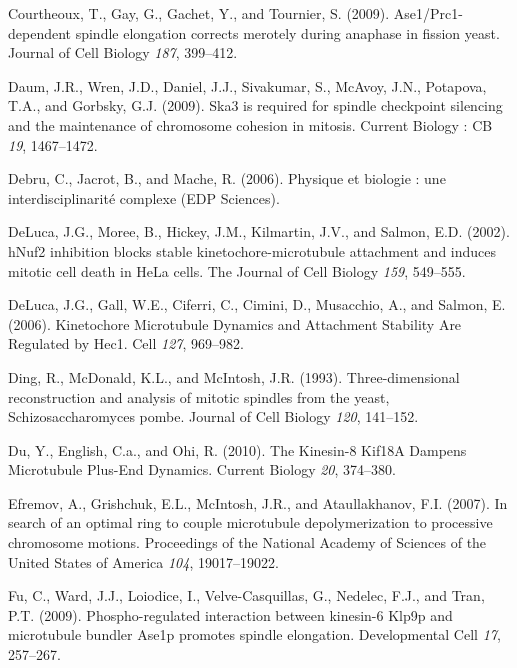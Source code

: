 \documentclass[12pt,a4paper,twoside,openright]{book}
\begin{document}
Courtheoux, T., Gay, G., Gachet, Y., and Tournier, S. (2009).
Ase1/Prc1-dependent spindle elongation corrects merotely during anaphase
in fission yeast. Journal of Cell Biology \emph{187}, 399--412.

Daum, J.R., Wren, J.D., Daniel, J.J., Sivakumar, S., McAvoy, J.N.,
Potapova, T.A., and Gorbsky, G.J. (2009). Ska3 is required for spindle
checkpoint silencing and the maintenance of chromosome cohesion in
mitosis. Current Biology : CB \emph{19}, 1467--1472.

Debru, C., Jacrot, B., and Mache, R. (2006). Physique et biologie : une
interdisciplinarité complexe (EDP Sciences).

DeLuca, J.G., Moree, B., Hickey, J.M., Kilmartin, J.V., and Salmon, E.D.
(2002). hNuf2 inhibition blocks stable kinetochore-microtubule
attachment and induces mitotic cell death in HeLa cells. The Journal of
Cell Biology \emph{159}, 549--555.

DeLuca, J.G., Gall, W.E., Ciferri, C., Cimini, D., Musacchio, A., and
Salmon, E. (2006). Kinetochore Microtubule Dynamics and Attachment
Stability Are Regulated by Hec1. Cell \emph{127}, 969--982.

Ding, R., McDonald, K.L., and McIntosh, J.R. (1993). Three-dimensional
reconstruction and analysis of mitotic spindles from the yeast,
Schizosaccharomyces pombe. Journal of Cell Biology \emph{120}, 141--152.

Du, Y., English, C.a., and Ohi, R. (2010). The Kinesin-8 Kif18A Dampens
Microtubule Plus-End Dynamics. Current Biology \emph{20}, 374--380.

Efremov, A., Grishchuk, E.L., McIntosh, J.R., and Ataullakhanov, F.I.
(2007). In search of an optimal ring to couple microtubule
depolymerization to processive chromosome motions. Proceedings of the
National Academy of Sciences of the United States of America \emph{104},
19017--19022.

Fu, C., Ward, J.J., Loiodice, I., Velve-Casquillas, G., Nedelec, F.J.,
and Tran, P.T. (2009). Phospho-regulated interaction between kinesin-6
Klp9p and microtubule bundler Ase1p promotes spindle elongation.
Developmental Cell \emph{17}, 257--267.
\end{document}
